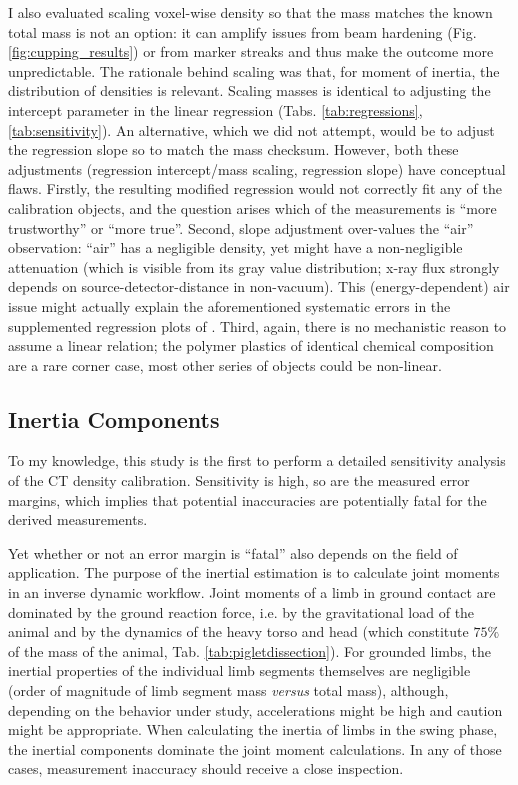 I also evaluated scaling voxel-wise density so that the mass matches the known total mass is not an option: it can amplify issues from beam hardening (Fig. \ref{fig:cupping_results}) or from marker streaks and thus make the outcome more unpredictable.
The rationale behind scaling was that, for moment of inertia, the distribution of densities is relevant.
Scaling masses is identical to adjusting the intercept parameter in the linear regression (Tabs. \ref{tab:regressions}, \ref{tab:sensitivity}).
An alternative, which we did not attempt, would be to adjust the regression slope so to match the mass checksum.
However, both these adjustments (regression intercept/mass scaling, regression slope) have conceptual flaws.
Firstly, the resulting modified regression would not correctly fit any of the calibration objects, and the question arises which of the measurements is ``more trustworthy'' or ``more true''.
Second, slope adjustment over-values the ``air'' observation: ``air'' has a negligible density, yet might have a non-negligible attenuation (which is visible from its gray value distribution; x-ray flux strongly depends on source-detector-distance in non-vacuum).
This (energy-dependent) air issue might actually explain the aforementioned systematic errors in the supplemented regression plots of \citet{Durston2022}.
Third, again, there is no mechanistic reason to assume a linear relation; the polymer plastics of identical chemical composition are a rare corner case, most other series of objects could be non-linear.


\subsection{Inertia Components}
\label{sec:org52d41be}
To my knowledge, this study is the first to perform a detailed sensitivity analysis of the CT density calibration.
Sensitivity is high, so are the measured error margins, which implies that potential inaccuracies are potentially fatal for the derived measurements.

Yet whether or not an error margin is ``fatal'' also depends on the field of application.
The purpose of the inertial estimation is to calculate joint moments in an inverse dynamic workflow.
Joint moments of a limb in ground contact are dominated by the ground reaction force, i.e. by the gravitational load of the animal and by the dynamics of the heavy torso and head (which constitute \(75 \%\) of the mass of the animal, Tab. \ref{tab:pigletdissection}).
For grounded limbs, the inertial properties of the individual limb segments themselves are negligible (order of magnitude of limb segment mass \emph{versus} total mass), although, depending on the behavior under study, accelerations might be high and caution might be appropriate.
When calculating the inertia of limbs in the swing phase, the inertial components dominate the joint moment calculations.
In any of those cases, measurement inaccuracy should receive a close inspection.


